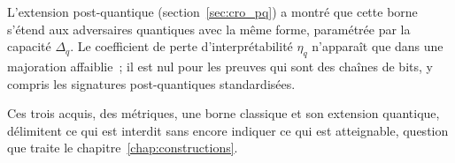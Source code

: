 \begin{sloppypar}
L'extension post-quantique (section~\ref{sec:cro_pq}) a montr\'e que
cette borne s'\'etend aux adversaires quantiques avec la m\^eme forme,
param\'etr\'ee par la capacit\'e $\Delta_q$. Le coefficient de perte
d'interpr\'etabilit\'e $\eta_q$ n'appara\^it que dans une majoration
affaiblie~; il est nul pour les preuves qui sont des cha\^ines de bits,
y compris les signatures post-quantiques standardis\'ees.

Ces trois acquis, des m\'etriques, une borne classique et son extension
quantique, d\'elimitent ce qui est interdit sans encore indiquer ce qui est
atteignable, question que traite le chapitre~\ref{chap:constructions}.
\end{sloppypar}
